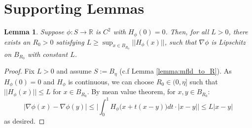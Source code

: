 \documentclass[11pt]{article}
\newcommand{\1}{\mathbf{1}}
\newtheorem{lemma}{Lemma}%
\theoremstyle{definition}
\theoremstyle{remark}
\begin{document}
\newpage
\printnomenclature

\newpage





\newpage
\appendix
\appendixpage
\addappheadtotoc
\section{Supporting Lemmas}\label{app:lemmas}


\begin{mdframed}
    \begin{lemma}\label{lem:lipschitz}
        Suppose $\phi:S\rightarrow \mathbb{R}$ is $C^2$ with $H_\phi(0)=0$. Then, for all $L>0$, there exists an $R_0>0$ satisfying $L\geq \sup_{x\in B_{R_0}}||H_\phi(x)||$, such that $\nabla \phi$ is Lipschitz on $B_{R_0}$ with constant $L$.
    \end{lemma}
\vspace{0.25cm}
\end{mdframed}
\begin{proof}
Fix $L>0$ and assume $S:=B_\eta$ (c.f Lemma \ref{lemma:mfld_to_R}). As $H_\phi(0)=0$ and $H_\phi$ is continuous, we can choose $R_0\in(0,\eta]$ such that $||H_\phi(x)||\leq L$ for $x\in B_{R_0}$. By mean value theorem, for $x,y\in B_{R_0}$:
\begin{equation}\nonumber
    |\nabla\phi(x)-\nabla\phi(y)| \leq \bigg|\int_0^1 H_{\phi}\big(x+t(x-y)\big)dt \cdot |x-y|\bigg| \leq L|x-y|
\end{equation}
as desired.
\end{proof}
\end{document}
